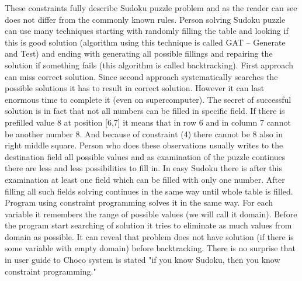 These constraints fully describe Sudoku puzzle problem and as the reader can see does not differ from the commonly known rules. Person solving Sudoku puzzle can use many techniques starting with randomly filling the table and looking if this is good solution (algorithm using this technique is called GAT -- Generate and Test) and ending with generating all possible fillings and repairing the solution if something fails (this algorithm is called backtracking). First approach can miss correct solution. Since second approach systematically searches the possible solutions it has to result in correct solution. However it can last enormous time to complete it (even on supercomputer). The secret of successful solution is in fact that not all numbers can be filled in specific field. If there is prefilled value 8 at position [6,7] it means that in row 6 and in column 7 cannot be another number 8. And because of constraint (4) there cannot be 8 also in right middle square. Person who does these observations usually writes to the destination field all possible values and as examination of the puzzle continues there are less and less possibilities to fill in. In easy Sudoku there is after this examination at least one field which can be filled with only one number. After filling all such fields solving continues in the same way until whole table is filled. Program using constraint programming solves it in the same way. For each variable it remembers the range of possible values (we will call it domain). Before the program start searching of solution it tries to eliminate as much values from domain as possible. It can reveal that problem does not have solution (if there is some variable with empty domain) before backtracking. There is no surprise that in user guide to Choco system is stated "if you know Sudoku, then you know constraint programming."

